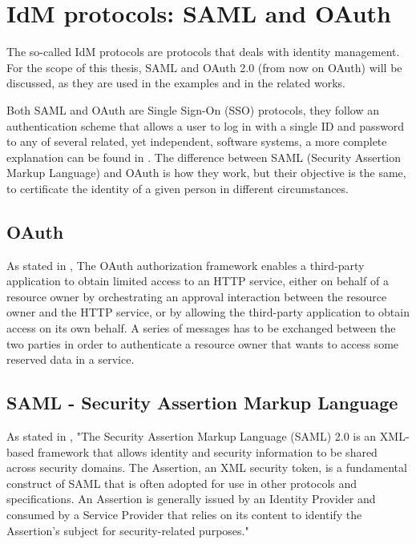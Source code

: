 \section{IdM protocols: SAML and OAuth}
The so-called IdM protocols are protocols that deals with identity management. For the scope of this thesis, SAML and \Gls{OAuth} 2.0 (from now on \Gls{OAuth}) will be discussed, as they are used in the examples and in the related works.

Both \Gls{SAML} and \Gls{OAuth} are Single Sign-On (SSO) protocols, they follow an authentication scheme that allows a user to log in with a single ID and password to any of several related, yet independent, software systems, a more complete explanation can be found in \cite{claudio_grisenti}. 
The difference between \Gls{SAML} (Security Assertion Markup Language) and \Gls{OAuth} is how they work, but their objective is the same, to certificate the identity of a given person in different circumstances.

\subsection{OAuth}
As stated in \cite{ietf_oauth2}, The \Gls{OAuth} authorization framework enables a third-party application to obtain limited access to an HTTP service, either on behalf of a resource owner by orchestrating an approval interaction between the resource owner and the HTTP service, or by allowing the third-party application to obtain access on its own behalf.
A series of messages has to be exchanged between the two parties in order to authenticate a resource owner that wants to access some reserved data in a service.

\subsection{SAML - Security Assertion Markup Language}
As stated in \cite{ietf_SAML}, "The Security Assertion Markup Language (\Gls{SAML}) 2.0 is an XML-based framework that allows identity and security information to be shared across security domains. The Assertion, an XML security token, is a fundamental construct of \Gls{SAML} that is often adopted for use in other protocols and specifications. An Assertion is generally issued by an Identity Provider and consumed by a Service Provider that relies on its content to identify the Assertion's subject for security-related purposes."





